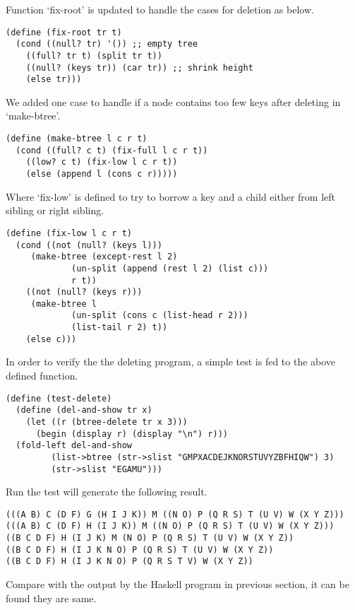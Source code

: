 \documentclass{article}
\begin{document}
Function `fix-root' is updated to handle the cases for deletion
as below.

\begin{lstlisting}
(define (fix-root tr t)
  (cond ((null? tr) '()) ;; empty tree
	((full? tr t) (split tr t))
	((null? (keys tr)) (car tr)) ;; shrink height
	(else tr)))
\end{lstlisting}

We added one case to handle if a node contains too few keys
after deleting in `make-btree'.

\begin{lstlisting}
(define (make-btree l c r t)
  (cond ((full? c t) (fix-full l c r t))
	((low? c t) (fix-low l c r t))
	(else (append l (cons c r)))))
\end{lstlisting}

Where `fix-low' is defined to try to borrow a key and a child
either from left sibling or right sibling.

\begin{lstlisting}
(define (fix-low l c r t)
  (cond ((not (null? (keys l)))
	 (make-btree (except-rest l 2)
		     (un-split (append (rest l 2) (list c)))
		     r t))
	((not (null? (keys r)))
	 (make-btree l
		     (un-split (cons c (list-head r 2)))
		     (list-tail r 2) t))
	(else c)))
\end{lstlisting}

In order to verify the the deleting program, a simple test is
fed to the above defined function.

\begin{lstlisting}
(define (test-delete)
  (define (del-and-show tr x)
    (let ((r (btree-delete tr x 3)))
      (begin (display r) (display "\n") r)))
  (fold-left del-and-show
	     (list->btree (str->slist "GMPXACDEJKNORSTUVYZBFHIQW") 3)
	     (str->slist "EGAMU")))
\end{lstlisting}

Run the test will generate the following result.

\begin{lstlisting}
(((A B) C (D F) G (H I J K)) M ((N O) P (Q R S) T (U V) W (X Y Z)))
(((A B) C (D F) H (I J K)) M ((N O) P (Q R S) T (U V) W (X Y Z)))
((B C D F) H (I J K) M (N O) P (Q R S) T (U V) W (X Y Z))
((B C D F) H (I J K N O) P (Q R S) T (U V) W (X Y Z))
((B C D F) H (I J K N O) P (Q R S T V) W (X Y Z))
\end{lstlisting}

Compare with the output by the Haskell program in previous section,
it can be found they are same.
\end{document}
